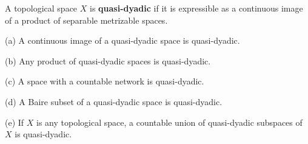  A topological space $X$ is {\bf quasi-dyadic}
if it is expressible as a continuous image of a product of separable
metrizable spaces.


 (a) A continuous image of a quasi-dyadic
space is quasi-dyadic.

(b) Any product of quasi-dyadic spaces is quasi-dyadic.

(c) A space with a countable network is quasi-dyadic.

(d) A Baire subset of a quasi-dyadic space is quasi-dyadic.

(e) If $X$ is any topological space, a countable union of quasi-dyadic
subspaces of $X$ is quasi-dyadic.

